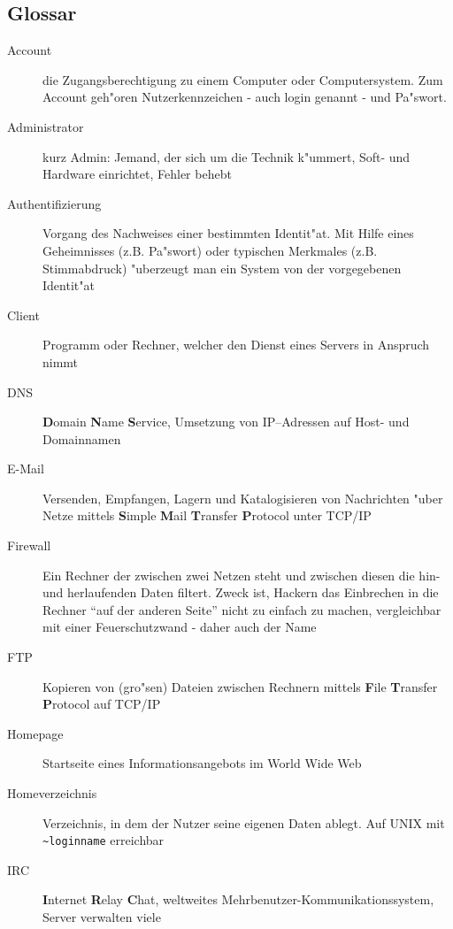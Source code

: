 \documentclass[12pt,titlepage,twoside]{scrartcl}
\begin{document}
\begin{appendix}
\clearpage

\section{Glossar}
\begin{description}
  \item[Account] die Zugangsberechtigung zu einem Computer oder
    Computersystem. Zum Account geh"oren Nutzerkennzeichen - auch login genannt
    - und Pa"swort.
  \item[Administrator] kurz Admin: Jemand, der sich um die Technik k"ummert,
    Soft- und Hardware einrichtet, Fehler behebt
  \item[Authentifizierung] Vorgang des Nachweises einer bestimmten
    Identit"at. Mit Hilfe eines Geheimnisses (z.B. Pa"swort) oder typischen
    Merkmales (z.B. Stimmabdruck) "uberzeugt man ein System von der
    vorgegebenen Identit"at
  \item[Client] Programm oder Rechner, welcher den Dienst eines Servers in
    Anspruch nimmt
  \item[DNS] \textbf{D}omain \textbf{N}ame \textbf{S}ervice, Umsetzung von
    IP--Adressen auf Host- und Domainnamen
  \item[E-Mail] Versenden, Empfangen, Lagern und Katalogisieren von
    Nachrichten "uber Netze mittels \textbf{S}imple \textbf{M}ail
    \textbf{T}ransfer \textbf{P}rotocol unter TCP/IP 
  \item[Firewall] Ein Rechner der zwischen zwei Netzen steht und zwischen
    diesen die hin- und herlaufenden Daten filtert. Zweck ist, Hackern das
    Einbrechen in die Rechner "`auf der anderen Seite"' nicht zu einfach zu
    machen, vergleichbar mit einer Feuerschutzwand - daher auch der Name
  \item[FTP] Kopieren von (gro"sen) Dateien zwischen Rechnern mittels 
      \textbf{F}ile \textbf{T}ransfer \textbf{P}rotocol auf TCP/IP
  \item[Homepage] Startseite eines Informationsangebots im World Wide Web
  \item[Homeverzeichnis] Verzeichnis, in dem der Nutzer seine eigenen Daten
    ablegt. Auf UNIX mit \verb#~loginname# erreichbar
  \item[IRC] \textbf{I}nternet \textbf{R}elay \textbf{C}hat, weltweites
    Mehrbenutzer-Kommunikationssystem, Server verwalten viele

\end{description}
\end{appendix}
\end{document}
